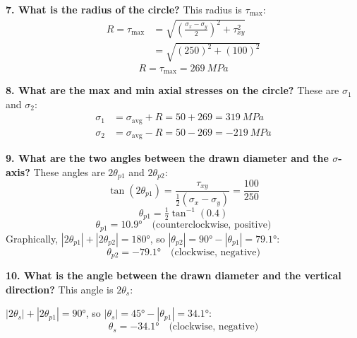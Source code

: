 \documentclass[11pt]{article}
\begin{document}
\bigskip
\noindent
\begin{minipage}[c]{0.53\textwidth}
\textbf{7. What is the radius of the circle?} This radius is $\tau_{\max}$:
\begin{align*}
  R = \tau_{\max} &= \sqrt{\left(\frac{\sigma_x - \sigma_y}{2}\right)^2 + \tau_{xy}^2} \\
  &= \sqrt{(250)^2 + (100)^2}
\end{align*}
\[ \boxed{R = \tau_{\max} = \SI{269}{MPa}} \]
\end{minipage}%
\hfill
\begin{minipage}[c]{0.44\textwidth}
\centering{}
\end{minipage}

\bigskip
\noindent
\begin{minipage}[c]{0.53\textwidth}
\textbf{8. What are the max and min axial stresses on the circle?} These are $\sigma_1$
and $\sigma_2$:
\begin{align*}
  \sigma_1 &= \sigma_{\text{avg}} + R = 50 + 269 = \boxed{\SI{319}{MPa}} \\
  \sigma_2 &= \sigma_{\text{avg}} - R = 50 - 269 = \boxed{-\SI{219}{MPa}}
\end{align*}
\end{minipage}%
\hfill
\begin{minipage}[c]{0.44\textwidth}
\centering{}
\end{minipage}

\bigskip
\noindent
\begin{minipage}[c]{0.53\textwidth}
\textbf{9. What are the two angles between the drawn diameter and the $\sigma$-axis?}
These angles are $2\theta_{p1}$ and $2\theta_{p2}$:
\[
  \tan(2\theta_{p1}) = \frac{\tau_{xy}}{\tfrac12(\sigma_x - \sigma_y)} = \frac{100}{250}
\]
\[
  \theta_{p1} = \tfrac12\tan^{-1}(0.4)
\]
\[ \boxed{\theta_{p1} = \ang{10.9}} \quad \text{(counterclockwise, positive)} \]
Graphically, $|2\theta_{p1}| + |2\theta_{p2}| = \ang{180}$, so
$|\theta_{p2}| = \ang{90} - |\theta_{p1}| = \ang{79.1}$:
\[ \boxed{\theta_{p2} = -\ang{79.1}} \quad \text{(clockwise, negative)} \]
\end{minipage}%
\hfill
\begin{minipage}[c]{0.44\textwidth}
\centering{}
\end{minipage}

\bigskip
\noindent
\begin{minipage}[c]{0.53\textwidth}
\textbf{10. What is the angle between the drawn diameter and the vertical direction?}
This angle is $2\theta_s$:

\smallskip
$|2\theta_s| + |2\theta_{p1}| = \ang{90}$, so
$|\theta_s| = \ang{45} - |\theta_{p1}| = \ang{34.1}$:
\[ \boxed{\theta_s = -\ang{34.1}} \quad \text{(clockwise, negative)} \]
\end{minipage}%
\hfill
\begin{minipage}[c]{0.44\textwidth}
\centering{}
\end{minipage}
\end{document}
